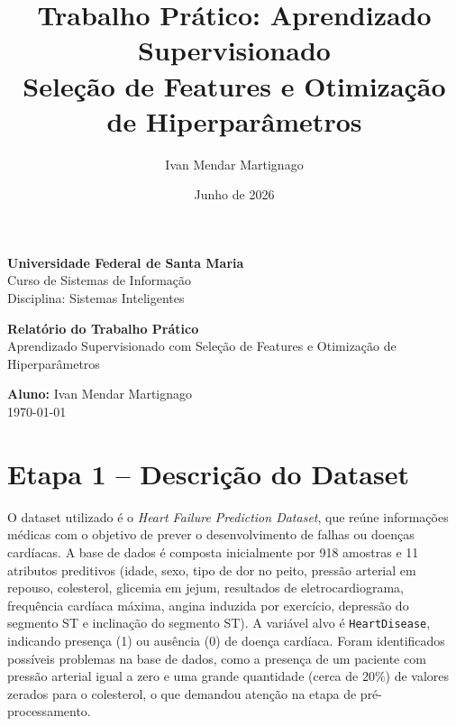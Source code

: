 \documentclass[12pt,a4paper]{article}
\title{Trabalho Prático: Aprendizado Supervisionado\\ \large Seleção de Features e Otimização de Hiperparâmetros}
\author{Ivan Mendar Martignago}
\date{Junho de 2026}
\begin{document}
\begin{titlepage}
    \centering
    \vspace*{1cm}
    \Large \textbf{Universidade Federal de Santa Maria}\\
    \Large Curso de Sistemas de Informação\\
    \Large Disciplina: Sistemas Inteligentes\\
    \vspace{4cm}
    
    \Huge \textbf{Relatório do Trabalho Prático}\\
    \large Aprendizado Supervisionado com Seleção de Features e Otimização de Hiperparâmetros\\
    \vspace{1.5cm}
    
    \Large \textbf{Aluno:} Ivan Mendar Martignago\\
    \vfill
    \large \today
\end{titlepage}

\maketitle

\section{Etapa 1 -- Descrição do Dataset}
O dataset utilizado é o \textit{Heart Failure Prediction Dataset}, que reúne informações médicas com o objetivo de prever o desenvolvimento de falhas ou doenças cardíacas. 
A base de dados é composta inicialmente por 918 amostras e 11 atributos preditivos (idade, sexo, tipo de dor no peito, pressão arterial em repouso, colesterol, glicemia em jejum, resultados de eletrocardiograma, frequência cardíaca máxima, angina induzida por exercício, depressão do segmento ST e inclinação do segmento ST). A variável alvo é \texttt{HeartDisease}, indicando presença (1) ou ausência (0) de doença cardíaca.
Foram identificados possíveis problemas na base de dados, como a presença de um paciente com pressão arterial igual a zero e uma grande quantidade (cerca de 20\%) de valores zerados para o colesterol, o que demandou atenção na etapa de pré-processamento.
\end{document}
